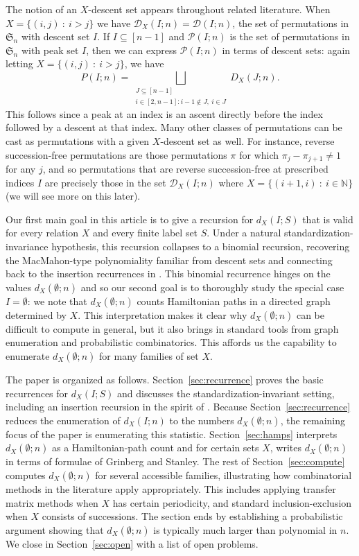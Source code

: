 \documentclass[12pt]{amsart}
\theoremstyle{definition}
\theoremstyle{remark}
\begin{document}
The notion of an $X$-descent set appears throughout related literature. When $X=\{(i,j) \ : \ i>j\}$ we have  $\mathcal{D}_X(I;n)=\mathcal{D}(I;n)$, the set of permutations in $\mathfrak{S}_n$ with descent set $I$. If $I \subseteq [n-1]$ and $\mathcal{P}(I;n)$ is the set of permutations in $\mathfrak{S}_n$ with peak set $I$, then we can express $\mathcal{P}(I;n)$ in terms of descent sets: again letting $X=\{(i,j) \ : \ i>j\}$, we have
\[
P(I;n) = \bigsqcup_{\substack{J \subseteq [n-1] \\ i \in [2,n-1] \colon i-1 \notin J, \ i \in J}} D_X(J;n).
\]
This follows since a peak at an index is an ascent directly before the index followed by a descent at that index. Many other classes of permutations can be cast as permutations with a given $X$-descent set as well. For instance, reverse succession-free permutations are those permutations $\pi$ for which $\pi_j - \pi_{j+1} \neq 1$ for any $j$, and so permutations that are reverse succession-free at prescribed indices $I$ are precisely those in the set $\mathcal{D}_X(I;n)$ where $X=\{(i+1,i) \ : \ i \in \mathbb{N}\}$ (we will see more on this later).

Our first main goal in this article is to give a recursion for $d_X(I;S)$ that is valid for every relation $X$ and every finite label set $S$.
Under a natural standardization-invariance hypothesis, this recursion collapses to a binomial recursion, recovering the
MacMahon-type polynomiality familiar from descent sets and connecting back to the insertion recurrences in
\cite{descentpolys}. This binomial recurrence hinges on the values $d_X(\emptyset;n)$ and so our second goal is to thoroughly study the special case $I=\emptyset$: we note that $d_X(\emptyset;n)$ counts Hamiltonian
paths in a directed graph determined by $X$.
This interpretation makes it clear why $d_X(\emptyset;n)$ can be difficult to compute in general, but it also brings
in standard tools from graph enumeration and probabilistic combinatorics. This affords us the capability to enumerate $d_X(\emptyset;n)$ for many families of set $X$.

\medskip
The paper is organized as follows.
Section~\ref{sec:recurrence} proves the basic recurrences for $d_X(I;S)$ and discusses the standardization-invariant
setting, including an insertion recursion in the spirit of \cite{descentpolys}. Because Section~\ref{sec:recurrence} reduces the enumeration of $d_X(I;n)$ to the numbers $d_X(\emptyset;n)$, the remaining focus of the paper is enumerating this statistic. 
Section~\ref{sec:hamps} interprets $d_X(\emptyset;n)$ as a Hamiltonian-path count and for certain sets $X$, writes $d_X(\emptyset;n)$ in terms of  formulae of
Grinberg and Stanley.
The rest of Section~\ref{sec:compute} computes $d_X(\emptyset;n)$ for several accessible families, illustrating how combinatorial methods in the literature apply appropriately. This includes applying transfer matrix methods when $X$ has certain periodicity, and standard inclusion-exclusion when $X$ consists of successions. The section ends by establishing a probabilistic argument showing that $d_X(\emptyset;n)$ is typically much larger than polynomial in $n$. We close in Section~\ref{sec:open} with a list of open problems.
\end{document}
